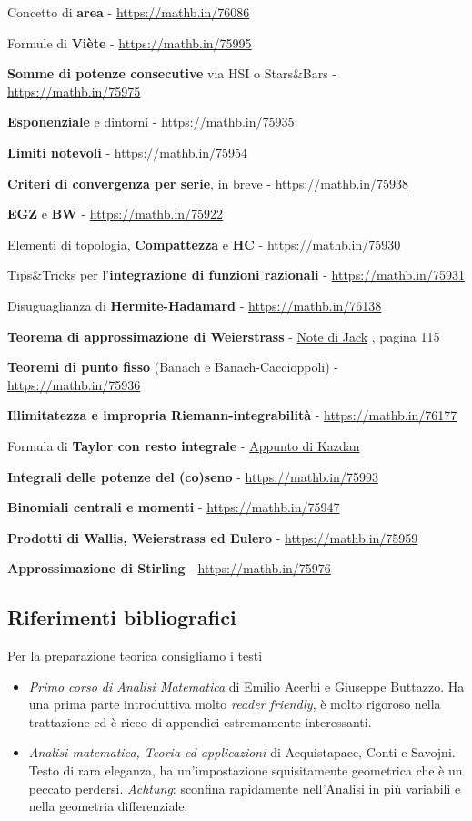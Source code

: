 \documentclass[a4paper,twoside]{article}
\theoremstyle{definition}
\numberwithin{theorem}{section}
\begin{document}
Concetto di \textbf{area} - \url{https://mathb.in/76086}

Formule di \textbf{Viète} - \url{https://mathb.in/75995}

\textbf{Somme di potenze consecutive} via HSI o Stars\&Bars - \url{https://mathb.in/75975}

\textbf{Esponenziale} e dintorni - \url{https://mathb.in/75935}

\textbf{Limiti notevoli} - \url{https://mathb.in/75954}

\textbf{Criteri di convergenza per serie}, in breve - \url{https://mathb.in/75938}

\textbf{EGZ} e \textbf{BW} - \url{https://mathb.in/75922}

Elementi di topologia, \textbf{Compattezza} e \textbf{HC} - \url{https://mathb.in/75930}

Tips\&Tricks per l'\textbf{integrazione di funzioni razionali} - \url{https://mathb.in/75931}

Disuguaglianza di \textbf{Hermite-Hadamard} - \url{https://mathb.in/76138}

\textbf{Teorema di approssimazione di Weierstrass} - \href{https://drive.google.com/file/d/1QKCejQNSohMTlZs-MPRndxo5tJ8H48Ez/view?usp=sharing}{Note di Jack} , pagina 115

\textbf{Teoremi di punto fisso} (Banach e Banach-Caccioppoli) - \url{https://mathb.in/75936}

\textbf{Illimitatezza e impropria Riemann-integrabilità} - \url{https://mathb.in/76177}

Formula di \textbf{Taylor con resto integrale} - \href{https://www2.math.upenn.edu/~kazdan/361F15/Notes/Taylor-integral.pdf}{Appunto di Kazdan}

\textbf{Integrali delle potenze del (co)seno} - \url{https://mathb.in/75993}

\textbf{Binomiali centrali e momenti} - \url{https://mathb.in/75947}

\textbf{Prodotti di Wallis, Weierstrass ed Eulero} - \url{https://mathb.in/75959}

\textbf{Approssimazione di Stirling} - \url{https://mathb.in/75976}


\subsection{Riferimenti bibliografici}

Per la preparazione teorica consigliamo i testi
\begin{itemize}
 \item \emph{Primo corso di Analisi Matematica} di Emilio Acerbi e Giuseppe Buttazzo. Ha una prima parte introduttiva molto \emph{reader friendly}, è molto rigoroso nella trattazione ed è ricco di appendici estremamente interessanti.
 \item \emph{Analisi matematica, Teoria ed applicazioni} di Acquistapace, Conti e Savojni. Testo di rara eleganza, ha un'impostazione squisitamente geometrica che è un peccato perdersi. \emph{Achtung}: sconfina rapidamente nell'Analisi in più variabili e nella geometria differenziale.
\end{itemize}
\end{document}

